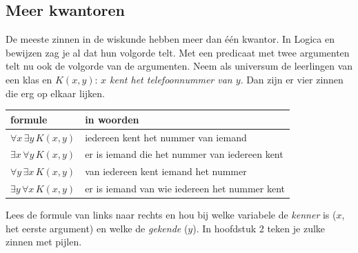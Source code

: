\begin{oefeningen}
\end{oefeningen}

\subsection{Meer kwantoren}

De meeste zinnen in de wiskunde hebben meer dan één kwantor. In Logica en bewijzen zag je al dat hun volgorde telt. Met een predicaat met twee argumenten telt nu ook de volgorde van de argumenten. Neem als universum de leerlingen van een klas en $K(x, y)$: \textit{$x$ kent het telefoonnummer van $y$}. Dan zijn er vier zinnen die erg op elkaar lijken.

\begin{center}\renewcommand{\arraystretch}{1.35}
\begin{tabular}{|l|l|}\hline
\rowcolor{accent!14} formule & in woorden \\ \hline
$\forall x\, \exists y\, K(x, y)$ & iedereen kent het nummer van iemand \\ \hline
$\exists x\, \forall y\, K(x, y)$ & er is iemand die het nummer van iedereen kent \\ \hline
$\forall y\, \exists x\, K(x, y)$ & van iedereen kent iemand het nummer \\ \hline
$\exists y\, \forall x\, K(x, y)$ & er is iemand van wie iedereen het nummer kent \\ \hline
\end{tabular}
\end{center}

Lees de formule van links naar rechts en hou bij welke variabele de \textit{kenner} is ($x$, het eerste argument) en welke de \textit{gekende} ($y$). In hoofdstuk 2 teken je zulke zinnen met pijlen.


